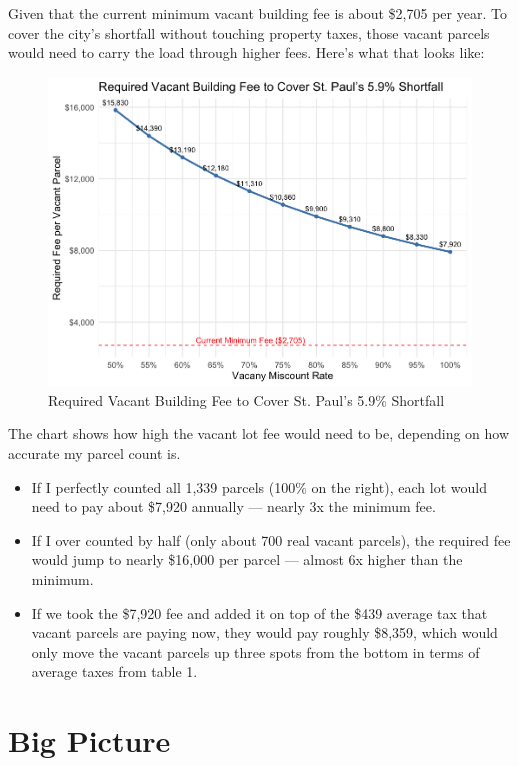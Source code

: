 \documentclass[12pt]{article}
\begin{document}
Given that the current minimum vacant building fee is about \$2,705 per year. To cover the city’s shortfall without touching property taxes, those vacant parcels would need to carry the load through higher fees. Here’s what that looks like:

\begin{figure}[H]
    \centering
    \includegraphics[width=0.9\linewidth]{st_paul_vacant_building_fee_graph.png}
    \caption{Required Vacant Building Fee to Cover St. Paul’s 5.9\% Shortfall}
\end{figure}

The chart shows how high the vacant lot fee would need to be, depending on how accurate my parcel count is.  

\begin{itemize}
    \item If I perfectly counted all 1,339 parcels (100\% on the right), each lot would need to pay about \$7,920 annually — nearly 3x the minimum fee.
    \item If I over counted by half (only about 700 real vacant parcels), the required fee would jump to nearly \$16,000 per parcel — almost 6x higher than the minimum.
    \item If we took the \$7,920 fee and added it on top of the \$439 average tax that vacant parcels are paying now, they would pay roughly \$8,359, which would only move the vacant parcels up three spots from the bottom in terms of average taxes from table 1.
\end{itemize}

\section*{Big Picture}
\end{document}
